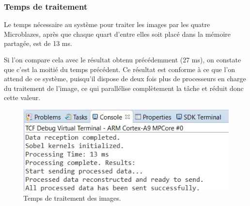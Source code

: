 \documentclass[../CSC_5RO07_TA.tex]{subfiles}
\begin{document}
\subsubsection{Temps de traitement}

Le temps nécessaire au système pour traiter les images par les quatre Microblazes, après que chaque quart d'entre elles soit placé dans la mémoire partagée, est de 13 ms. 

Si l'on compare cela avec le résultat obtenu précédemment (27 ms), on constate que c'est la moitié du temps précédent. Ce résultat est conforme à ce que l'on attend de ce système, puisqu'il dispose de deux fois plus de processeurs en charge du traitement de l'image, ce qui parallélise complètement la tâche et réduit donc cette valeur.

\begin{figure}[H]
    \centering
    \includegraphics[width=0.5\columnwidth]{./images/Resutlado2.jpg}
    \caption{Temps de traitement des images.}
    \label{fig:11}
\end{figure}
\end{document}
